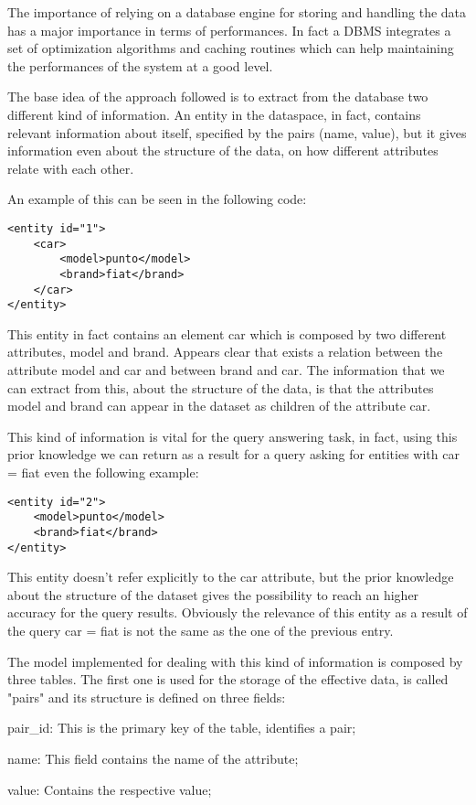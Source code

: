 \documentclass{acm_proc_article-sp-sigmod07}
\begin{document}
The importance of relying on a database engine for storing and handling the
data has a major importance in terms of performances. In fact a DBMS
integrates a set of optimization algorithms and caching routines which can
help maintaining the performances of the system at a good level.

The base idea of the approach followed is to extract from the database two
different kind of information. An entity in the dataspace, in fact,
contains relevant information about itself, specified by the pairs
(name, value), but it gives information even about the structure of the
data, on how different attributes relate with each other.

An example of this can be seen in the following code:

\begin{verbatim}
<entity id="1">
    <car>
        <model>punto</model>
        <brand>fiat</brand>
    </car>
</entity>
\end{verbatim}

This entity in fact contains an element car which is composed by two
different attributes, model and brand. Appears clear that exists a
relation between the attribute model and car and between brand and car.
The information that we can extract from this, about the structure of the
data, is that the attributes model and brand can appear in the dataset as
children of the attribute car.

This kind of information is vital for the query answering task, in fact,
using this prior knowledge we can return as a result for a query asking
for entities with car = fiat even the following example: 

\begin{verbatim}
<entity id="2">
    <model>punto</model>
    <brand>fiat</brand>
</entity>
\end{verbatim}

This entity doesn't refer explicitly to the car attribute, but the prior
knowledge about the structure of the dataset gives the possibility to
reach an higher accuracy for the query results.
Obviously the relevance of this entity as a result of the query car = fiat
is not the same as the one of the previous entry.

The model implemented for dealing with this kind of information is
composed by three tables. The first one is used for the storage of the
effective data, is called "pairs" and its structure is defined on three
fields:
\begin{description}
\item{pair\_id: } This is the primary key of the table, identifies a pair;
\item{name: } This field contains the name of the attribute;
\item{value: } Contains the respective value;
\end{description}
\end{document}
